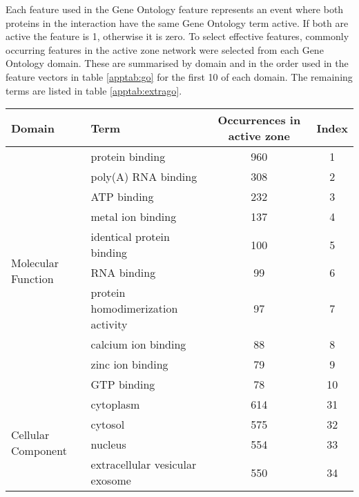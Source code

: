 Each feature used in the Gene Ontology feature represents an event where both proteins in the interaction have the same Gene Ontology term active.
If both are active the feature is 1, otherwise it is zero.
To select effective features, commonly occurring features in the active zone network were selected from each Gene Ontology domain.
These are summarised by domain and in the order used in the feature vectors in table \ref{apptab:go} for the first 10 of each domain.
The remaining terms are listed in table \ref{apptab:extrago}.

\begin{table}
    \centering
    \begin{tabular}{l p{} c c}
        \small
        Domain              & Term                      & Occurrences in active zone & Index\\
        \hline
        \multirow{10}{*}{Molecular Function}  & protein binding           & 960 & 1 \\
                                              & poly(A) RNA binding       & 308 & 2 \\
                                              & ATP binding               & 232  & 3 \\
                                              & metal ion binding         & 137 & 4 \\
                                              & identical protein binding & 100 & 5 \\
                                              & RNA binding               & 99 & 6 \\
                                              & protein homodimerization activity & 97 & 7 \\
                                              & calcium ion binding & 88 & 8 \\
                                              & zinc ion binding & 79 & 9 \\
                                              & GTP binding & 78 & 10 \\
        \hline
        \multirow{10}{*}{Cellular Component}  & cytoplasm & 614 & 31 \\
                                              & cytosol & 575 & 32 \\
                                              & nucleus & 554 & 33 \\
                                              & extracellular vesicular exosome & 550 & 34 \\

\end{tabular}
\end{table}

